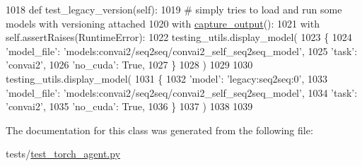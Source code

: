 \begin{DoxyCode}
1018     \textcolor{keyword}{def }test\_legacy\_version(self):
1019         \textcolor{comment}{# simply tries to load and run some models with versioning attached}
1020         with \hyperlink{namespaceparlai_1_1utils_1_1testing_ab00d4d693202afab92c06387aa50699b}{capture\_output}():
1021             with self.assertRaises(RuntimeError):
1022                 testing\_utils.display\_model(
1023                     \{
1024                         \textcolor{stringliteral}{'model\_file'}: \textcolor{stringliteral}{'models:convai2/seq2seq/convai2\_self\_seq2seq\_model'},
1025                         \textcolor{stringliteral}{'task'}: \textcolor{stringliteral}{'convai2'},
1026                         \textcolor{stringliteral}{'no\_cuda'}: \textcolor{keyword}{True},
1027                     \}
1028                 )
1029 
1030             testing\_utils.display\_model(
1031                 \{
1032                     \textcolor{stringliteral}{'model'}: \textcolor{stringliteral}{'legacy:seq2seq:0'},
1033                     \textcolor{stringliteral}{'model\_file'}: \textcolor{stringliteral}{'models:convai2/seq2seq/convai2\_self\_seq2seq\_model'},
1034                     \textcolor{stringliteral}{'task'}: \textcolor{stringliteral}{'convai2'},
1035                     \textcolor{stringliteral}{'no\_cuda'}: \textcolor{keyword}{True},
1036                 \}
1037             )
1038 
1039 
\end{DoxyCode}


The documentation for this class was generated from the following file\+:\begin{DoxyCompactItemize}
\item 
tests/\hyperlink{test__torch__agent_8py}{test\+\_\+torch\+\_\+agent.\+py}\end{DoxyCompactItemize}
